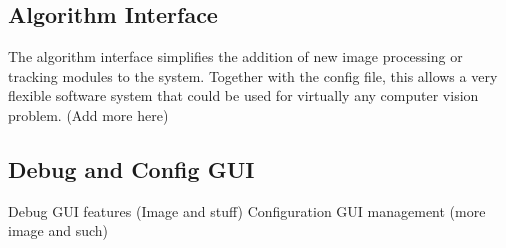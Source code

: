 \subsection{Algorithm Interface}
The algorithm interface simplifies the addition of new image processing or tracking modules to the system. Together with the config file, this allows a very flexible software system that could be used for virtually any computer vision problem. (Add more here)

\subsection{Debug and Config GUI}
Debug GUI features (Image and stuff)
Configuration GUI management (more image and such)

